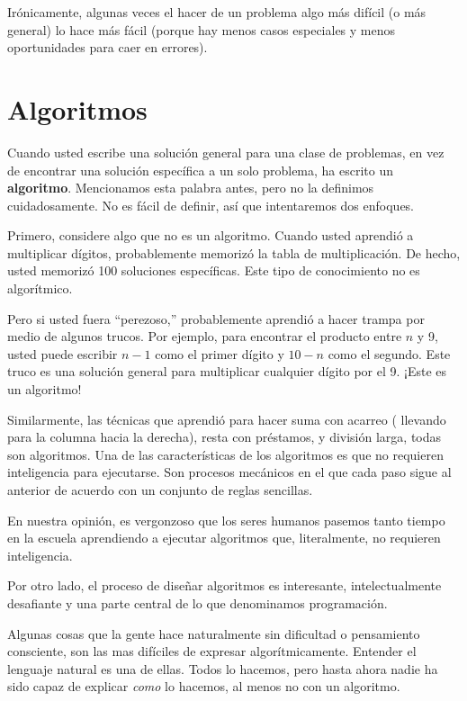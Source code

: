Irónicamente, algunas veces el hacer de un problema algo más difícil
(o más general) lo hace más fácil (porque hay menos casos especiales
y menos oportunidades para caer en errores).

\section{Algoritmos}


Cuando usted escribe una solución general para una clase de problemas,
en vez de encontrar una solución específica a un solo problema, ha
escrito un \textbf{algoritmo}. Mencionamos esta palabra antes, pero
no la definimos cuidadosamente. No es fácil de definir, así que intentaremos
dos enfoques.

Primero, considere algo que no es un algoritmo. Cuando usted aprendió
a multiplicar dígitos, probablemente memorizó la tabla de multiplicación.
De hecho, usted memorizó 100 soluciones específicas. Este tipo de
conocimiento no es algorítmico.

Pero si usted fuera ``perezoso,'' probablemente aprendió a hacer
trampa por medio de algunos trucos. Por ejemplo, para encontrar el
producto entre $n$ y 9, usted puede escribir $n-1$ como el primer
dígito y $10-n$ como el segundo. Este truco es una solución general
para multiplicar cualquier dígito por el 9. ¡Este es un algoritmo!

Similarmente, las técnicas que aprendió para hacer suma con acarreo
( llevando para la columna hacia la derecha), resta con préstamos,
y división larga, todas son algoritmos. Una de las características
de los algoritmos es que no requieren inteligencia para ejecutarse.
Son procesos mecánicos en el que cada paso sigue al anterior de acuerdo
con un conjunto de reglas sencillas.

En nuestra opinión, es vergonzoso que los seres humanos pasemos tanto
tiempo en la escuela aprendiendo a ejecutar algoritmos que, literalmente,
no requieren inteligencia.

Por otro lado, el proceso de diseñar algoritmos es interesante, intelectualmente
desafiante y una parte central de lo que denominamos programación.

Algunas cosas que la gente hace naturalmente sin dificultad o pensamiento
consciente, son las mas difíciles de expresar algorítmicamente. Entender
el lenguaje natural es una de ellas. Todos lo hacemos, pero hasta
ahora nadie ha sido capaz de explicar {\em como} lo hacemos, al
menos no con un algoritmo.

